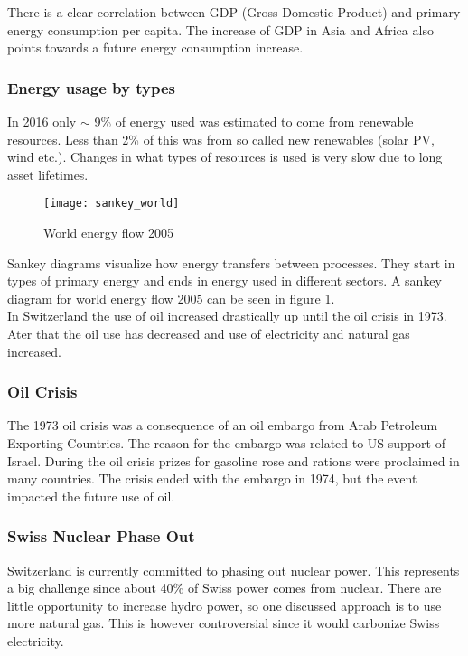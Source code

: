There is a clear correlation between GDP (Gross Domestic Product) and primary energy consumption per capita. The increase of GDP in Asia and Africa also points towards a future energy consumption increase.

\subsubsection{Energy usage by types}
In 2016 only $\sim$ 9\% of energy used was estimated to come from renewable resources.
Less than 2\% of this was from so called new renewables (solar PV, wind etc.).
Changes in what types of resources is used is very slow due to long asset lifetimes.\\

\begin{figure}
    \centering
    \texttt{[image: sankey\_world]}
    \caption{World energy flow 2005}
    \label{fig:sankey_world}
\end{figure}

Sankey diagrams visualize how energy transfers between processes.
They start in types of primary energy and ends in energy used in different sectors.
A sankey diagram for world energy flow 2005 can be seen in figure \ref{fig:sankey_world}.\\

In Switzerland the use of oil increased drastically up until the oil crisis in 1973.
Ater that the oil use has decreased and use of electricity and natural gas increased.

\subsubsection{Oil Crisis}
The 1973 oil crisis was a consequence of an oil embargo from Arab Petroleum Exporting Countries.
The reason for the embargo was related to US support of Israel.
During the oil crisis prizes for gasoline rose and rations were proclaimed in many countries. The crisis ended with the embargo in 1974, but the event impacted the future use of oil.

\subsubsection{Swiss Nuclear Phase Out}
Switzerland is currently committed to phasing out nuclear power.
This represents a big challenge since about 40\% of Swiss power comes from nuclear.
There are little opportunity to increase hydro power, so one discussed approach is to use more natural gas.
This is however controversial since it would carbonize Swiss electricity.

